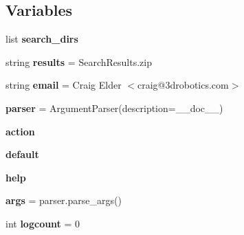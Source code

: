 \subsection*{Variables}
\begin{DoxyCompactItemize}
\item 
list {\bfseries search\+\_\+dirs}
\item 
\mbox{\label{namespacepymavlink_1_1tools_1_1AccelSearch_a9a479651d64962eb0d1d91b8e0508a30}} 
string {\bfseries results} = \textquotesingle{}Search\+Results.\+zip\textquotesingle{}
\item 
\mbox{\label{namespacepymavlink_1_1tools_1_1AccelSearch_a34cf6b60e874d51185ab2fc4997c9ef5}} 
string {\bfseries email} = \textquotesingle{}Craig Elder $<$craig@3drobotics.\+com$>$\textquotesingle{}
\item 
\mbox{\label{namespacepymavlink_1_1tools_1_1AccelSearch_ad06281c25f5ea505bac4b15673f6ede4}} 
{\bfseries parser} = Argument\+Parser(description=\+\_\+\+\_\+doc\+\_\+\+\_\+)
\item 
\mbox{\label{namespacepymavlink_1_1tools_1_1AccelSearch_a3d70b34e6a21c2df5e3df48dd8777f85}} 
{\bfseries action}
\item 
\mbox{\label{namespacepymavlink_1_1tools_1_1AccelSearch_af62bdada39e5ed5688eb4806078f1a54}} 
{\bfseries default}
\item 
\mbox{\label{namespacepymavlink_1_1tools_1_1AccelSearch_a4d74e7e29e6b7f40261872ea8865404c}} 
{\bfseries help}
\item 
\mbox{\label{namespacepymavlink_1_1tools_1_1AccelSearch_a9f46afe0132c571acbf4f536a68e6276}} 
{\bfseries args} = parser.\+parse\+\_\+args()
\item 
\mbox{\label{namespacepymavlink_1_1tools_1_1AccelSearch_adfb9f84bfd3c391863e97281c326d0f5}} 
int {\bfseries logcount} = 0
\item 

\end{DoxyCompactItemize}
